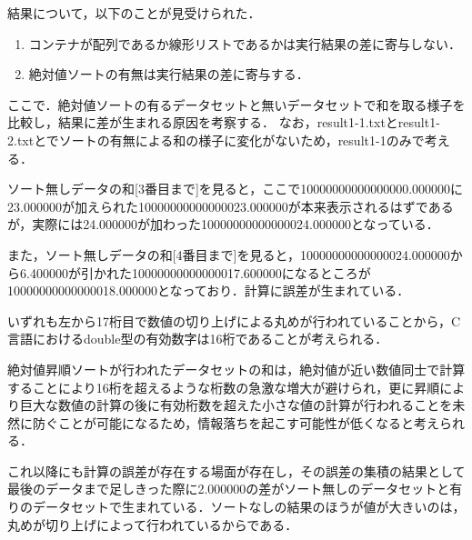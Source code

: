 結果について，以下のことが見受けられた．
\begin{enumerate}
\item コンテナが配列であるか線形リストであるかは実行結果の差に寄与しない．
\item 絶対値ソートの有無は実行結果の差に寄与する．
\end{enumerate}

ここで．絶対値ソートの有るデータセットと無いデータセットで和を取る様子を比較し，結果に差が生まれる原因を考察する．
なお，result1-1.txtとresult1-2.txtとでソートの有無による和の様子に変化がないため，result1-1のみで考える．

ソート無しデータの和[3番目まで]を見ると，ここで10000000000000000.000000に23.000000が加えられた10000000000000023.000000が本来表示されるはずであるが，実際には24.000000が加わった10000000000000024.000000となっている．

また，ソート無しデータの和[4番目まで]を見ると，10000000000000024.000000から6.400000が引かれた10000000000000017.600000になるところが10000000000000018.000000となっており．計算に誤差が生まれている．

いずれも左から17桁目で数値の切り上げによる丸めが行われていることから，C言語におけるdouble型の有効数字は16桁であることが考えられる．

絶対値昇順ソートが行われたデータセットの和は，絶対値が近い数値同士で計算することにより16桁を超えるような桁数の急激な増大が避けられ，更に昇順により巨大な数値の計算の後に有効桁数を超えた小さな値の計算が行われることを未然に防ぐことが可能になるため，情報落ちを起こす可能性が低くなると考えられる．

これ以降にも計算の誤差が存在する場面が存在し，その誤差の集積の結果として最後のデータまで足しきった際に2.000000の差がソート無しのデータセットと有りのデータセットで生まれている．ソートなしの結果のほうが値が大きいのは，丸めが切り上げによって行われているからである．







